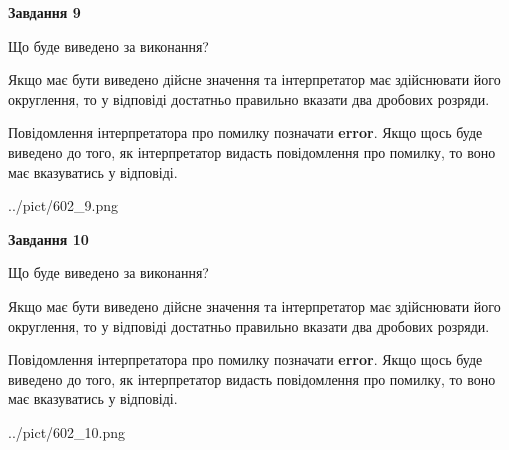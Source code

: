 \documentclass[12pt, ukrainian]{article}
\begin{document}
{\begin {Large}
{\begin {center}\textbf{Завдання 9}\end {center}}\par
Що буде виведено за виконання? \par

Якщо має бути виведено дійсне значення та інтерпретатор має здійснювати його округлення, 
то у відповіді достатньо правильно вказати два дробових розряди.

Повідомлення інтерпретатора про помилку позначати \textbf{error}.
Якщо щось буде виведено до того, як інтерпретатор видасть повідомлення про помилку, 
то воно має вказуватись у відповіді. \par

\begin{center}
	{../pict/602_9.png}
\end{center}
\newpage

{\begin {center}\textbf{Завдання 10}\end {center}}\par
Що буде виведено за виконання? \par

Якщо має бути виведено дійсне значення та інтерпретатор має здійснювати його округлення, 
то у відповіді достатньо правильно вказати два дробових розряди.

Повідомлення інтерпретатора про помилку позначати \textbf{error}.
Якщо щось буде виведено до того, як інтерпретатор видасть повідомлення про помилку, 
то воно має вказуватись у відповіді. \par

\begin{center}
	{../pict/602_10.png}
\end{center}
\newpage

\end {Large}}
\end{document}
